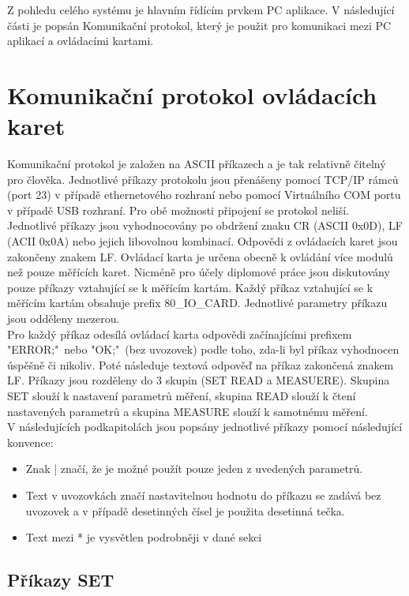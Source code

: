 Z pohledu celého systému je hlavním řídícím prvkem PC aplikace. V následující části je popsán Komunikační
protokol, který je použit pro komunikaci mezi PC aplikací a ovládacími kartami.

\section{Komunikační protokol ovládacích karet}
Komunikační protokol je založen na ASCII příkazech a je tak relativně čitelný pro člověka.
Jednotlivé příkazy protokolu jsou přenášeny pomocí TCP/IP rámců (port 23) v případě ethernetového rozhraní nebo
pomocí Virtuálního COM portu v případě USB rozhraní. Pro obě možnosti připojení se protokol neliší.\\

Jednotlivé příkazy jsou vyhodnocovány po obdržení znaku CR (ASCII 0x0D), LF (ACII 0x0A) nebo jejich libovolnou kombinací. Odpovědi
z ovládacích karet jsou zakončeny znakem LF. Ovládací karta je určena obecně k ovládání více modulů než pouze měřících karet. Nicméně pro účely
diplomové práce jsou diskutovány pouze příkazy vztahující se k měřícím kartám. Každý příkaz vztahující se k měřícím kartám obsahuje prefix 80\_IO\_CARD.
Jednotlivé parametry příkazu jsou odděleny mezerou.\\

Pro každý příkaz odesílá ovládací karta odpovědi začínajícími prefixem "ERROR;"\ nebo "OK;"\ (bez uvozovek) podle toho, zda-li byl příkaz vyhodnocen úspěšně či nikoliv.
Poté následuje textová odpověď na příkaz zakončená znakem LF.
Příkazy jsou rozděleny do 3 skupin (SET READ a MEASUERE). Skupina SET slouží k nastavení parametrů měření, skupina READ slouží k čtení nastavených parametrů
a skupina MEASURE slouží k samotnému měření.\\

V následujících podkapitolách jsou popsány jednotlivé příkazy pomocí následující konvence:
\begin{itemize}
    \item Znak | značí, že je možné použít pouze jeden z uvedených parametrů.
    \item Text v uvozovkách značí nastavitelnou hodnotu do příkazu se zadává bez uvozovek a v případě desetinných čísel je použita desetinná tečka.
    \item Text mezi * je vysvětlen podrobněji v dané sekci
    
\end{itemize}

\subsection{Příkazy SET}
